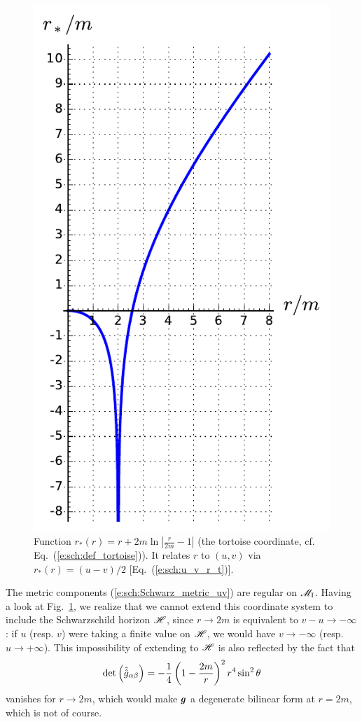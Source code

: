 \begin{figure}
\centerline{\includegraphics[height=0.4\textheight]{sch_tortoise.pdf}}
\caption[]{\label{f:sch:tortoise} \footnotesize
Function $r_*(r) = r + 2 m \ln \left| \frac{r}{2m} - 1 \right|$
(the tortoise coordinate, cf. Eq.~(\ref{e:sch:def_tortoise})).
It relates $r$ to $(u,v)$ via $r_*(r) = (u-v)/2$ [Eq.~(\ref{e:sch:u_v_r_t})].}
\end{figure}

The metric components (\ref{e:sch:Schwarz_metric_uv}) are regular on $\mathscr{M}_{\rm I}$.
Having a look at Fig.~\ref{f:sch:tortoise}, we realize that we cannot extend
this coordinate system to include the Schwarzschild horizon $\mathscr{H}$, since
$r\rightarrow 2m$ is equivalent to $v-u\rightarrow -\infty$: if $u$ (resp. $v$)
were taking a finite value on $\mathscr{H}$, we would have $v\rightarrow -\infty$
(resp. $u\rightarrow +\infty$). This impossibility of extending to $\mathscr{H}$
is also reflected by the fact that
\[
    \det \left( \hat{\hat{g}}_{\alpha\beta} \right) =
        - \frac{1}{4} \left( 1 - \frac{2 m}{r} \right) ^2 r^4 \sin^2\theta
\]
vanishes for $r\rightarrow 2m$, which would make $\bm{g}$ a degenerate bilinear
form at $r=2m$, which is not of course.

